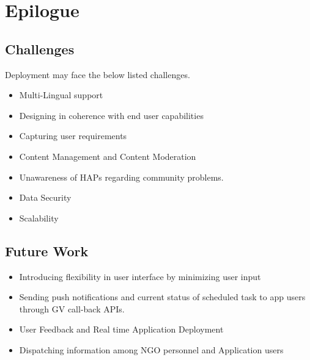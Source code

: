 \chapter{Epilogue}

\section{Challenges}
Deployment may face the below listed challenges.
\begin{itemize}
\item Multi-Lingual support
\item Designing in coherence with end user capabilities
\item Capturing user requirements
\item Content Management and Content Moderation
\item Unawareness of HAPs regarding community problems.
\item Data Security
\item Scalability
\end{itemize}

\section{Future Work}

\begin{itemize}
\item Introducing flexibility in user interface by minimizing user input
\item Sending push notifications and current status of scheduled task to app users through GV call-back APIs.
\item User Feedback and Real time Application Deployment
\item Dispatching information among NGO personnel and Application users 
\end{itemize}